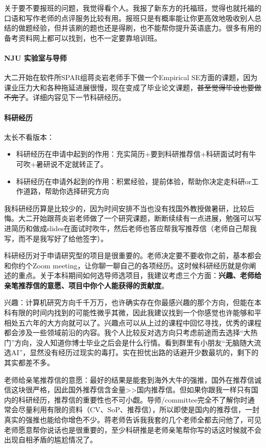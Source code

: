 关于要不要报班的问题，我觉得看个人。我报了新东方的托福班，觉得也就托福的口语和写作老师的点评服务比较有用。报班只是有概率能让你更高效地吸收别人总结的做题经验，但并该刷的题也还是得刷，也不能帮你提升英语底力。很多有用的备考资料网上都可以找到，也不一定要靠培训班。


\paragraph{NJU 实验室与导师}
大二开始在软件所SPAR组蒋炎岩老师手下做一个Empirical SE方面的课题，因为课业压力大和各种拖延进展很慢，现在变成了毕业论文课题，\sout{甚至觉得毕设也要做不完了}。详细内容见下一节科研经历。


\paragraph{科研经历}
太长不看版本：

\begin{itemize}
    \item 科研经历在申请中起到的作用：充实简历+要到科研推荐信+科研面试时有牛可吹+暑研说不定就转正了。
    \item 科研经历在申请外起到的作用：积累经验，提前体验，帮助你决定走科研or工作道路，帮助你选择研究方向
\end{itemize}

我科研经历算是比较少的，因为时间安排不当也没有找国外教授做暑研，比较后悔。大二开始跟蒋炎岩老师做了一个研究课题，断断续续有一点进展，勉强可以写进简历和做成slides在面试时吹牛，然后老师也答应帮我写推荐信（老师自己帮我写，而不是我写好了给他签字）。

科研经历对于申请研究型的项目是很重要的。老师决定要不要收你之前，基本都会和你约个Zoom meeting，让你聊一聊自己的各项经历。这时候科研经历就是你阐述的重点。关于本科期间如何选导师选项目，我建议考虑三个方面：{\bf{兴趣、老师给亲笔推荐信的意愿、项目中你个人能获得的贡献度}}。 

兴趣：计算机研究方向千千万万，也许确实存在你最感兴趣的那个方向，但能在本科有限的时间内找到的可能性微乎其微，因此我建议找到一个你感觉也许能够和平相处五六年的大方向就可以了。兴趣点可以从上过的课程中回忆寻找，优秀的课程都会涉及一些领域前沿的内容。我个人比较反对选方向只考虑前途而去选择“大热门”方向，没人知道你博士毕业之后会是什么行情。看到群里有小朋友“无脑随大流选AI”，显然没有经历过现实的毒打。实在担忧出路的话避开少数最坑的，剩下的其实都差不多。

老师给亲笔推荐信的意愿：最好的结果是能套到海外大牛的强推，国外在推荐信诚信这块很严格，因此国外推荐信含金量>>国内推荐信。但如果你跟我一样只有国内的科研经历，推荐信的重要性也不可小觑。导师/committee完全不了解你时通常会尽量利用有限的资料（CV、SoP、推荐信），所以即使是国内的推荐信，一封真实的强推也能给你增色不少。蒋老师告诉我我套的几个老师全都去问他了，可见老师愿意帮你说话也是很重要的，至少科研推是老师亲笔帮你写的话这时候就不会出现自相矛盾的尴尬情况了。

